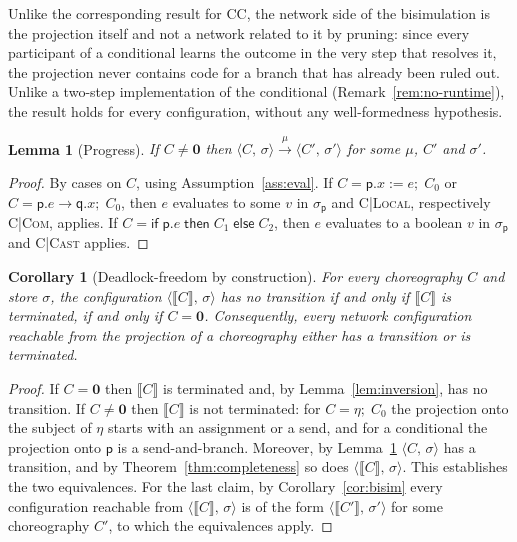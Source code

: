 \documentclass[11pt]{article}
\theoremstyle{plain}
\newtheorem{lemma}[theorem]{Lemma}
\newtheorem{corollary}[theorem]{Corollary}
\theoremstyle{definition}
\theoremstyle{remark}
\newcommand{\kw}[1]{\mathsf{#1}}
\newcommand{\kif}{\kw{if}\;}
\newcommand{\kthen}{\;\kw{then}\;}
\newcommand{\kelse}{\;\kw{else}\;}
\newcommand{\nil}{\mathbf{0}}
\newcommand{\seq}{;\;}
\newcommand{\pp}{\mathsf{p}}
\newcommand{\qq}{\mathsf{q}}
\newcommand{\conf}[2]{\langle #1,\, #2\rangle}
\newcommand{\lto}[1]{\xrightarrow{\;#1\;}}
\newcommand{\projn}[1]{\llbracket #1 \rrbracket}
\newcommand{\rn}[1]{{\normalfont\scshape #1}}
\newcommand{\ifcond}[3]{\kif #1 \kthen #2 \kelse #3}
\begin{document}
Unlike the corresponding result for CC, the network side of the bisimulation
is the projection itself and not a network related to it by pruning: since
every participant of a conditional learns the outcome in the very step that
resolves it, the projection never contains code for a branch that has
already been ruled out.  Unlike a two-step implementation of the conditional
(Remark~\ref{rem:no-runtime}), the result holds for every configuration,
without any well-formedness hypothesis.

\begin{lemma}[Progress]\label{lem:progress}
  If $C\neq\nil$ then $\conf{C}{\sigma}\lto{\mu}\conf{C'}{\sigma'}$ for some
  $\mu$, $C'$ and $\sigma'$.
\end{lemma}
\begin{proof}
  By cases on $C$, using Assumption~\ref{ass:eval}.  If $C = \pp.x := e\seq C_0$
  or $C = \pp.e\to\qq.x\seq C_0$, then $e$ evaluates to some $v$ in
  $\sigma_\pp$ and \rn{C|Local}, respectively \rn{C|Com}, applies.  If
  $C = \ifcond{\pp.e}{C_1}{C_2}$, then $e$ evaluates to a boolean $v$ in
  $\sigma_\pp$ and \rn{C|Cast} applies.
\end{proof}

\begin{corollary}[Deadlock-freedom by construction]\label{cor:df}
  For every choreography $C$ and store $\sigma$, the configuration
  $\conf{\projn{C}}{\sigma}$ has no transition if and only if $\projn{C}$ is
  terminated, if and only if $C = \nil$.  Consequently, every network
  configuration reachable from the projection of a choreography either has a
  transition or is terminated.
\end{corollary}
\begin{proof}
  If $C = \nil$ then $\projn{C}$ is terminated and, by
  Lemma~\ref{lem:inversion}, has no transition.  If $C\neq\nil$ then
  $\projn{C}$ is not terminated: for $C = \eta\seq C_0$ the projection onto
  the subject of $\eta$ starts with an assignment or a send, and for a
  conditional the projection onto $\pp$ is a send-and-branch.  Moreover, by
  Lemma~\ref{lem:progress} $\conf{C}{\sigma}$ has a transition, and by
  Theorem~\ref{thm:completeness} so does $\conf{\projn{C}}{\sigma}$.  This
  establishes the two equivalences.  For the last claim, by
  Corollary~\ref{cor:bisim} every configuration reachable from
  $\conf{\projn{C}}{\sigma}$ is of the form $\conf{\projn{C'}}{\sigma'}$ for
  some choreography $C'$, to which the equivalences apply.
\end{proof}
\end{document}
